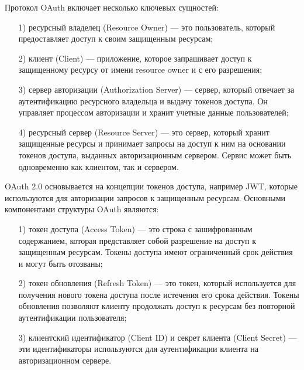 
Протокол OAuth включает несколько ключевых сущностей:
 \begin{enumerate}
  \item[1)] ресурсный владелец (Resource Owner) --- это пользователь, который предоставляет доступ к своим защищенным ресурсам;
  \item[2)] клиент (Client) --- приложение, которое запрашивает доступ к защищенному ресурсу от имени resource owner и с его разрешения;
  \item[3)] сервер авторизации (Authorization Server) --- сервер, который отвечает за аутентификацию ресурсного владельца и выдачу токенов доступа. Он управляет процессом авторизации и хранит учетные данные пользователей;
  \item[4)] ресурсный сервер (Resource Server) --- это сервер, который хранит защищенные ресурсы и принимает запросы на доступ к ним на основании токенов доступа, выданных авторизационным сервером. Сервис может быть одновременно как клиентом, так и сервером.
\end{enumerate}

OAuth 2.0 основывается на концепции токенов доступа, например JWT, которые используются для авторизации запросов к защищенным ресурсам.
Основными компонентами структуры OAuth являются:
 \begin{enumerate}
  \item[1)] токен доступа (Access Token) --- это строка с зашифрованным содержанием, которая представляет собой разрешение на доступ к защищенным ресурсам. Токены доступа имеют ограниченный срок действия и могут быть отозваны;
  \item[2)] токен обновления (Refresh Token) --- это токен, который используется для получения нового токена доступа после истечения его срока действия. Токены обновления позволяют клиенту продолжать доступ к ресурсам без повторной аутентификации пользователя;
  \item[3)] клиентский идентификатор (Client ID) и секрет клиента (Client Secret) --- эти идентификаторы используются для аутентификации клиента на авторизационном сервере.
\end{enumerate}

